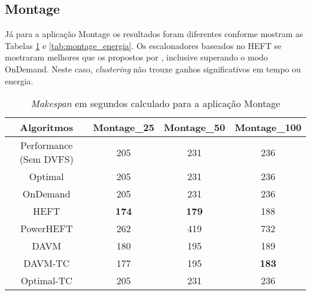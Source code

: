 \subsection{Montage} %
\label{sub:montage}

Já para a aplicação Montage os resultados foram diferentes conforme mostram as
Tabelas \ref{tab:montage_tempo} e \ref{tab:montage_energia}. Os escalonadores
baseados no HEFT se mostraram melhores que os propostos por
\cite{guerout:energy_aware_simulation}, inclusive superando o modo OnDemand.
Neste caso, \emph{clustering} não trouxe ganhos significativos em tempo ou
energia.

\begin{table}
	\centering
    \begin{tabular}{c|ccc}
    \hline
    \textbf{Algoritmos}    & \textbf{Montage\_25} & \textbf{Montage\_50} & \textbf{Montage\_100} \\ \hline
    Performance (Sem DVFS) & 205        & 231        & 236         \\
    \cite{guerout:energy_aware_simulation} Optimal      & 205        & 231        & 236         \\
    \cite{guerout:energy_aware_simulation} OnDemand     & 205        & 231        & 236         \\
    HEFT                   & \textbf{174}        & \textbf{179}        & 188         \\
    PowerHEFT              & 262        & 419        & 732         \\
    DAVM                   & 180        & 195        & 189         \\
    DAVM-TC                & 177        & 195        & \textbf{183}         \\
    Optimal-TC             & 205        & 231        & 236         \\ \hline
    \end{tabular}
    \caption{\emph{Makespan} em segundos calculado para a aplicação Montage}
    \label{tab:montage_tempo}
\end{table}



